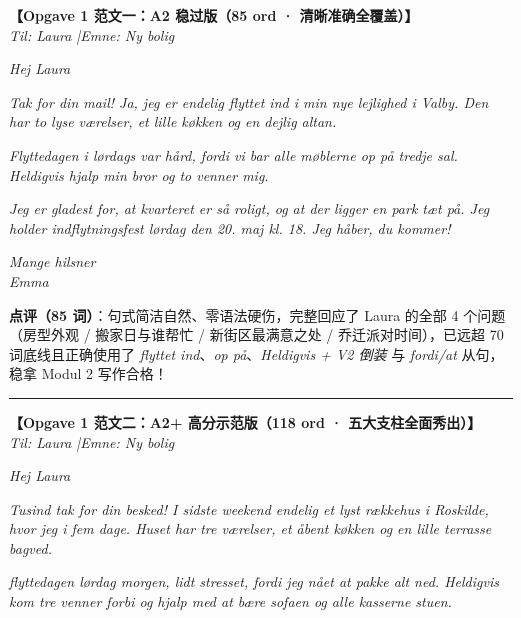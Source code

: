 \begin{answerbox}
\textbf{\color{NCDNavy}【Opgave 1 范文一：A2 稳过版（85 ord · 清晰准确全覆盖）】}\\
\textit{Til: Laura \quad|\quad Emne: Ny bolig}

\vspace{0.25em}
\textit{Hej Laura}

\vspace{0.2em}
\textit{Tak for din mail! Ja, jeg er endelig flyttet ind i min nye lejlighed i Valby. Den har to lyse værelser, et lille køkken og en dejlig altan.}

\vspace{0.2em}
\textit{Flyttedagen i lørdags var hård, fordi vi bar alle møblerne op på tredje sal. Heldigvis hjalp min bror og to venner mig.}

\vspace{0.2em}
\textit{Jeg er gladest for, at kvarteret er så roligt, og at der ligger en park tæt på. Jeg holder indflytningsfest lørdag den 20. maj kl. 18. Jeg håber, du kommer!}

\vspace{0.2em}
\textit{Mange hilsner\\
Emma}

\vspace{0.25em}
\small\textbf{点评（85 词）}：句式简洁自然、零语法硬伤，完整回应了 Laura 的全部 4 个问题（房型外观 / 搬家日与谁帮忙 / 新街区最满意之处 / 乔迁派对时间），已远超 70 词底线且正确使用了 \textit{flyttet ind}、\textit{op på}、\textit{Heldigvis + V2 倒装} 与 \textit{fordi/at} 从句，稳拿 Modul 2 写作合格！

\vspace{0.45em}
\hrule
\vspace{0.45em}

\textbf{\color{NCDRed}【Opgave 1 范文二：A2+ 高分示范版（118 ord · 五大支柱全面秀出）】}\\
\textit{Til: Laura \quad|\quad Emne: Ny bolig}

\vspace{0.25em}
\textit{Hej Laura}

\vspace{0.2em}
\textit{Tusind tak for din besked! I sidste weekend  endelig  et lyst rækkehus i Roskilde, hvor jeg  i fem dage. Huset har tre værelser, et åbent køkken og en lille terrasse  bagved.}

\vspace{0.2em}
\textit{ flyttedagen lørdag morgen,  lidt stresset, fordi jeg  nået at pakke alt ned. Heldigvis kom tre venner forbi og hjalp med at bære sofaen og alle kasserne  stuen.}


\end{answerbox}
